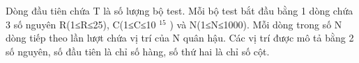 Dòng đầu tiên chứa T là số lượng bộ test. Mỗi bộ test bắt đầu bằng 1 dòng chứa 3 số nguyên R(1≤R≤25), C(1≤C≤10    $^     15    $    ) và N(1≤N≤1000). Mỗi dòng trong số N dòng tiếp theo lần lượt chứa vị trí của N quân hậu. Các vị trí được mô tả bằng 2 số nguyên, số đầu tiên là chỉ số hàng, số thứ hai là chỉ số cột.   

\